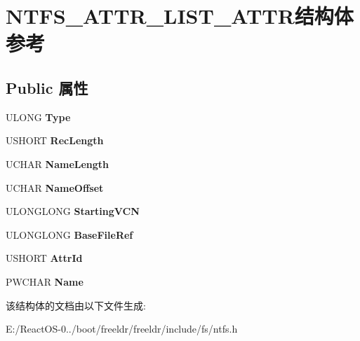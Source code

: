 \hypertarget{struct_n_t_f_s___a_t_t_r___l_i_s_t___a_t_t_r}{}\section{N\+T\+F\+S\+\_\+\+A\+T\+T\+R\+\_\+\+L\+I\+S\+T\+\_\+\+A\+T\+T\+R结构体 参考}
\label{struct_n_t_f_s___a_t_t_r___l_i_s_t___a_t_t_r}
\subsection*{Public 属性}
\begin{DoxyCompactItemize}
\item 
\mbox{\label{struct_n_t_f_s___a_t_t_r___l_i_s_t___a_t_t_r_ac7029ef3156ab13c4d6d122f78e4c51b}} 
U\+L\+O\+NG {\bfseries Type}
\item 
\mbox{\label{struct_n_t_f_s___a_t_t_r___l_i_s_t___a_t_t_r_a9032bbed01dfa91aca004b71fb55141a}} 
U\+S\+H\+O\+RT {\bfseries Rec\+Length}
\item 
\mbox{\label{struct_n_t_f_s___a_t_t_r___l_i_s_t___a_t_t_r_abefc30101edf90644b1fabc587c864b2}} 
U\+C\+H\+AR {\bfseries Name\+Length}
\item 
\mbox{\label{struct_n_t_f_s___a_t_t_r___l_i_s_t___a_t_t_r_a0a70a1125c211ee387605a1213eccf21}} 
U\+C\+H\+AR {\bfseries Name\+Offset}
\item 
\mbox{\label{struct_n_t_f_s___a_t_t_r___l_i_s_t___a_t_t_r_afb92911feb3509a6c720fc085c874d76}} 
U\+L\+O\+N\+G\+L\+O\+NG {\bfseries Starting\+V\+CN}
\item 
\mbox{\label{struct_n_t_f_s___a_t_t_r___l_i_s_t___a_t_t_r_a5b6fb02020397b8cc25eefff3cf32f9b}} 
U\+L\+O\+N\+G\+L\+O\+NG {\bfseries Base\+File\+Ref}
\item 
\mbox{\label{struct_n_t_f_s___a_t_t_r___l_i_s_t___a_t_t_r_a66d54b5a000b76835797b270e9e34b6f}} 
U\+S\+H\+O\+RT {\bfseries Attr\+Id}
\item 
\mbox{\label{struct_n_t_f_s___a_t_t_r___l_i_s_t___a_t_t_r_a4d1b13ca708a8de7a97122531d21c77a}} 
P\+W\+C\+H\+AR {\bfseries Name}
\end{DoxyCompactItemize}


该结构体的文档由以下文件生成\+:\begin{DoxyCompactItemize}
\item 
E\+:/\+React\+O\+S-\/0../boot/freeldr/freeldr/include/fs/ntfs.\+h\end{DoxyCompactItemize}
